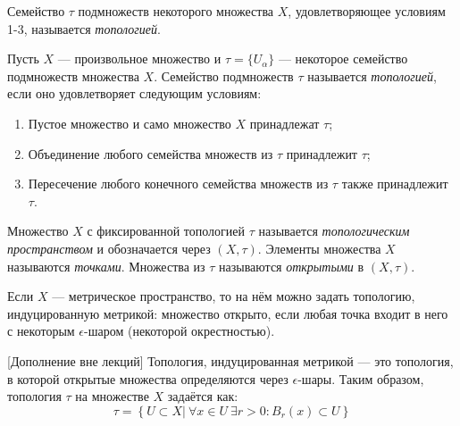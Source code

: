 
\begin{definition}
    Семейство $\tau$ подмножеств некоторого множества $X$, удовлетворяющее условиям 1-3, называется \textit{топологией}.
\end{definition}

\begin{definition}
    Пусть $X$ — произвольное множество и $\tau = \{U_{\alpha}\}$ — некоторое семейство подмножеств множества $X$. Семейство подмножеств $\tau$ называется \textit{топологией}, если оно удовлетворяет следующим условиям:
    \begin{enumerate}
        \item Пустое множество и само множество $X$ принадлежат $\tau$;
        \item Объединение любого семейства множеств из $\tau$ принадлежит $\tau$;
        \item Пересечение любого конечного семейства множеств из $\tau$ также принадлежит $\tau$.
    \end{enumerate}
\end{definition}

\begin{definition}
    Множество $X$ с фиксированной топологией $\tau$ называется \textit{топологическим пространством} и обозначается через $(X, \tau)$. Элементы множества $X$ называются \textit{точками}. Множества из $\tau$ называются \textit{открытыми} в $(X, \tau)$.
\end{definition}

Если $X$ — метрическое пространство, то на нём можно задать топологию, индуцированную метрикой: множество открыто, если любая точка входит в него с некоторым $\epsilon$-шаром (некоторой окрестностью).

[Дополнение вне лекций] Топология, индуцированная метрикой — это топология, в которой открытые множества определяются через $\epsilon$-шары. Таким образом, топология $\tau$ на множестве $X$ задаётся как:
\[\tau = \left\{U \subset X | \ \forall x \in U \ \exists r > 0: B_r(x) \subset U\right\}\]

